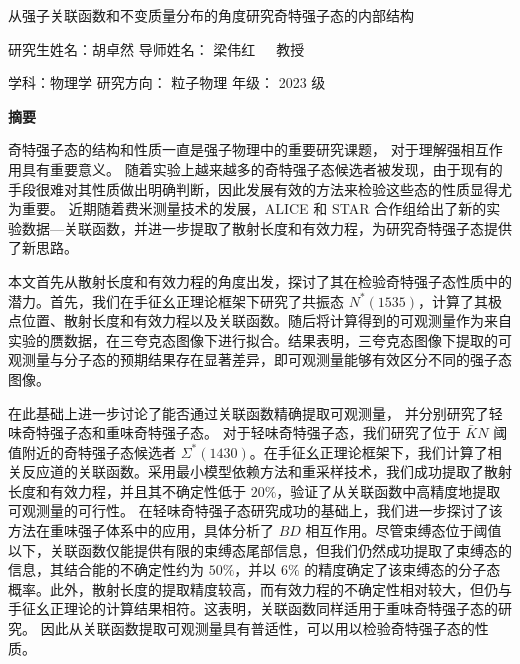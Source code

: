 \begin{center}
\heiti 从强子关联函数和不变质量分布的角度研究奇特强子态的内部结构
\end{center}


\vspace{-0.2cm}
\centerline{\normalsize{\songti 研究生姓名：胡卓然}\hspace{40pt} \normalsize{ \songti 导师姓名：
\hspace{0pt}梁伟红~~~教授}}
\centerline{\normalsize{ \songti 学科：物理学\quad}\normalsize{ \songti 研究方向： 粒子物理\quad}\normalsize{ \songti 年级： 2023 级} }
\vspace{0.5cm}
\centerline{\textbf{\songti 摘要}}
\vspace{0.1cm}

奇特强子态的结构和性质一直是强子物理中的重要研究课题，
对于理解强相互作用具有重要意义。
随着实验上越来越多的奇特强子态候选者被发现，由于现有的手段很难对其性质做出明确判断，因此发展有效的方法来检验这些态的性质显得尤为重要。
近期随着费米测量技术的发展，ALICE 和 STAR 合作组给出了新的实验数据—关联函数，并进一步提取了散射长度和有效力程，为研究奇特强子态提供了新思路。

本文首先从散射长度和有效力程的角度出发，探讨了其在检验奇特强子态性质中的潜力。首先，我们在手征幺正理论框架下研究了共振态 \(N^*(1535)\)，计算了其极点位置、散射长度和有效力程以及关联函数。随后将计算得到的可观测量作为来自实验的赝数据，在三夸克态图像下进行拟合。结果表明，三夸克态图像下提取的可观测量与分子态的预期结果存在显著差异，即可观测量能够有效区分不同的强子态图像。

在此基础上进一步讨论了能否通过关联函数精确提取可观测量，
并分别研究了轻味奇特强子态和重味奇特强子态。
对于轻味奇特强子态，我们研究了位于 \(\bar{K}N\) 阈值附近的奇特强子态候选者 \(\Sigma^*(1430)\)。在手征幺正理论框架下，我们计算了相关反应道的关联函数。采用最小模型依赖方法和重采样技术，我们成功提取了散射长度和有效力程，并且其不确定性低于 $20\%$，验证了从关联函数中高精度地提取可观测量的可行性。
在轻味奇特强子态研究成功的基础上，我们进一步探讨了该方法在重味强子体系中的应用，具体分析了 \(BD\) 相互作用。尽管束缚态位于阈值以下，关联函数仅能提供有限的束缚态尾部信息，但我们仍然成功提取了束缚态的信息，其结合能的不确定性约为 $50\%$，并以 $6\%$ 的精度确定了该束缚态的分子态概率。此外，散射长度的提取精度较高，而有效力程的不确定性相对较大，但仍与手征幺正理论的计算结果相符。这表明，关联函数同样适用于重味奇特强子态的研究。
因此从关联函数提取可观测量具有普适性，可以用以检验奇特强子态的性质。

